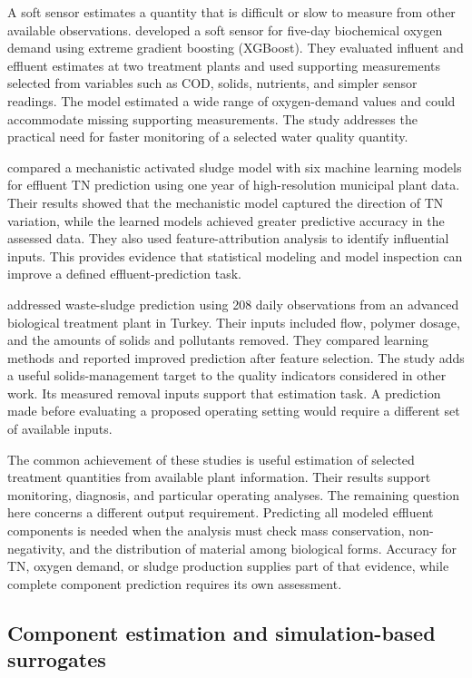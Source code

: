 A soft sensor estimates a quantity that is difficult or slow to measure from other available observations. \citet{Ching2022} developed a soft sensor for five-day biochemical oxygen demand using extreme gradient boosting (XGBoost). They evaluated influent and effluent estimates at two treatment plants and used supporting measurements selected from variables such as COD, solids, nutrients, and simpler sensor readings. The model estimated a wide range of oxygen-demand values and could accommodate missing supporting measurements. The study addresses the practical need for faster monitoring of a selected water quality quantity.

\citet{Wang2025} compared a mechanistic activated sludge model with six machine learning models for effluent TN prediction using one year of high-resolution municipal plant data. Their results showed that the mechanistic model captured the direction of TN variation, while the learned models achieved greater predictive accuracy in the assessed data. They also used feature-attribution analysis to identify influential inputs. This provides evidence that statistical modeling and model inspection can improve a defined effluent-prediction task.

\citet{Ekinci2023} addressed waste-sludge prediction using 208 daily observations from an advanced biological treatment plant in Turkey. Their inputs included flow, polymer dosage, and the amounts of solids and pollutants removed. They compared learning methods and reported improved prediction after feature selection. The study adds a useful solids-management target to the quality indicators considered in other work. Its measured removal inputs support that estimation task. A prediction made before evaluating a proposed operating setting would require a different set of available inputs.

The common achievement of these studies is useful estimation of selected treatment quantities from available plant information. Their results support monitoring, diagnosis, and particular operating analyses. The remaining question here concerns a different output requirement. Predicting all modeled effluent components is needed when the analysis must check mass conservation, non-negativity, and the distribution of material among biological forms. Accuracy for TN, oxygen demand, or sludge production supplies part of that evidence, while complete component prediction requires its own assessment.

\subsection{Component estimation and simulation-based surrogates}

